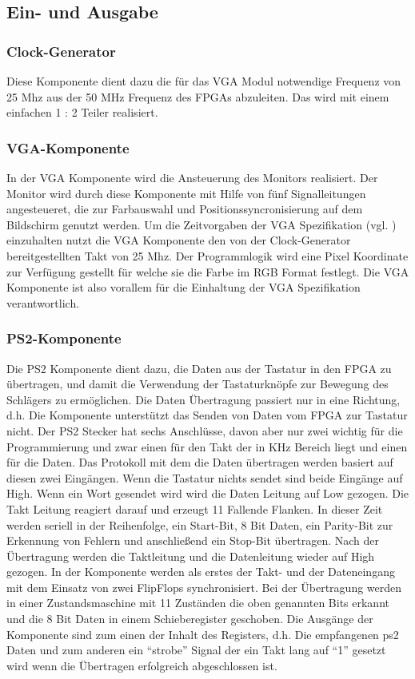 \documentclass{scrartcl}
\begin{document}
\subsection{Ein- und Ausgabe}
\subsubsection{Clock-Generator}
Diese Komponente dient dazu die für das VGA Modul notwendige Frequenz von 25 Mhz aus der 50 MHz Frequenz des FPGAs abzuleiten.
Das wird mit einem einfachen 1 : 2 Teiler realisiert.


\subsubsection{VGA-Komponente}
In der VGA Komponente wird die Ansteuerung des Monitors realisiert.
Der Monitor wird durch diese Komponente mit Hilfe von fünf Signalleitungen angesteueret, die zur Farbauswahl und Positionssyncronisierung auf dem Bildschirm genutzt werden.
Um die Zeitvorgaben der VGA Spezifikation (vgl. \cite[S.~23ff]{handbuch})
einzuhalten nutzt die VGA Komponente den von der Clock-Generator bereitgestellten Takt von 25 Mhz.
Der Programmlogik wird eine Pixel Koordinate zur Verfügung gestellt für welche sie die Farbe im RGB Format festlegt.
Die VGA Komponente ist also vorallem für die Einhaltung der VGA Spezifikation verantwortlich.


\subsubsection{PS2-Komponente}
Die PS2 Komponente dient dazu, die Daten aus der Tastatur in den FPGA zu
übertragen, und damit die Verwendung der Tastaturknöpfe zur Bewegung des
Schlägers zu ermöglichen.
Die Daten Übertragung passiert nur in eine Richtung, d.h. Die Komponente
unterstützt das Senden von Daten vom FPGA zur Tastatur nicht.
Der PS2 Stecker hat sechs Anschlüsse, davon aber nur zwei wichtig für die
Programmierung und zwar einen für den Takt der in KHz Bereich liegt und einen
für die Daten.
Das Protokoll mit dem die Daten übertragen werden basiert auf diesen zwei
Eingängen.
Wenn die Tastatur nichts sendet sind beide Eingänge auf High.
Wenn ein Wort gesendet wird wird die Daten Leitung auf Low gezogen.
Die Takt Leitung reagiert darauf und erzeugt 11 Fallende Flanken.
In dieser Zeit werden seriell in der Reihenfolge, ein Start-Bit, 8 Bit Daten,
ein Parity-Bit zur Erkennung von Fehlern und anschließend ein Stop-Bit übertragen.
Nach der Übertragung werden die Taktleitung und die Datenleitung wieder auf
High gezogen.
In der Komponente werden als erstes der Takt- und der Dateneingang mit dem
Einsatz von zwei FlipFlops synchronisiert.
Bei der Übertragung werden in einer Zustandsmaschine mit 11 Zuständen die oben
genannten Bits erkannt und die 8 Bit Daten in einem Schieberegister geschoben.
Die Ausgänge der Komponente sind zum einen der Inhalt des Registers, d.h. Die
empfangenen ps2 Daten und zum anderen ein "`strobe"' Signal der ein Takt lang
auf "`1"'  gesetzt wird wenn die Übertragen erfolgreich abgeschlossen ist.
\end{document}
